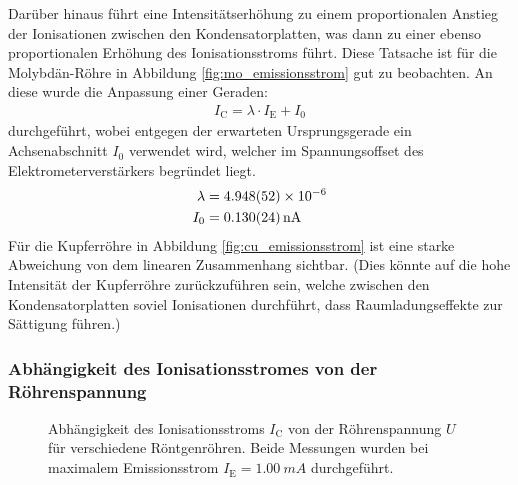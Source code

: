 \documentclass[11pt, a4paper]{article}
\numberwithin{equation}{section}
\begin{document}
Darüber hinaus führt eine Intensitätserhöhung zu einem proportionalen Anstieg der Ionisationen zwischen den Kondensatorplatten, was dann zu einer ebenso proportionalen Erhöhung des Ionisationsstroms führt.
Diese Tatsache ist für die Molybdän-Röhre in Abbildung \ref{fig:mo_emissionsstrom} gut zu beobachten.
An diese wurde die Anpassung einer Geraden:
\begin{align}
	I_\mathrm{C} = \lambda \cdot I_\mathrm{E} + I_0
\end{align}
durchgeführt, wobei entgegen der erwarteten Ursprungsgerade ein Achsenabschnitt $I_0$ verwendet wird, welcher im Spannungsoffset des Elektrometerverstärkers begründet liegt.
\begin{align*}
	\lambda &= \num{4.948 +- 0.052e-6}\\
	I_0 &= \SI{0.130 +- 0.024}{nA}
\end{align*}
Für die Kupferröhre in Abbildung \ref{fig:cu_emissionsstrom} ist eine starke Abweichung von dem linearen Zusammenhang sichtbar.
(Dies könnte auf die hohe Intensität der Kupferröhre zurückzuführen sein, welche zwischen den Kondensatorplatten soviel Ionisationen durchführt, dass Raumladungseffekte zur Sättigung führen.)


\subsubsection{Abhängigkeit des Ionisationsstromes von der Röhrenspannung}
\begin{figure}[hp]
	\centering
	\vspace{-10mm}
	
	\begin{subfigure}[b]{1\textwidth}
		
		\label{fig:mo_roehrenspannung}
	\end{subfigure}
	
	\vspace{2.5mm}
	
	\begin{subfigure}[b]{1\textwidth}
		
		\label{fig:cu_roehrenspannung}
	\end{subfigure}
	\caption{Abhängigkeit des Ionisationsstroms $I_\mathrm{C}$ von der Röhrenspannung $U$ für verschiedene Röntgenröhren. Beide Messungen wurden bei maximalem Emissionsstrom $I_\mathrm{E} = \SI{1.00}{mA}$ durchgeführt.}
	\label{fig:abh_roehrenspannung}
\end{figure}
\end{document}
